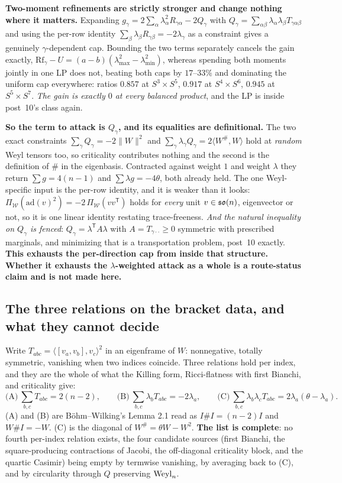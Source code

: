 \textbf{Two-moment refinements are strictly stronger and change nothing where it matters.} Expanding $g_\gamma=2\sum_\alpha\lambda_\alpha^2R_{\gamma\alpha}-2Q_\gamma$ with $Q_\gamma=\sum_{\alpha\beta}\lambda_\alpha\lambda_\beta T_{\gamma\alpha\beta}$ and using the per-row identity $\sum_\beta\lambda_\beta R_{\gamma\beta}=-2\lambda_\gamma$ as a constraint gives a genuinely $\gamma$-dependent cap. Bounding the two terms separately cancels the gain exactly, $\mathrm{Rf}_\gamma-U=(a-b)(\lambda_{\max}^2-\lambda_{\min}^2)$, whereas spending both moments jointly in one LP does not, beating both caps by $17$--$33\%$ and dominating the uniform cap everywhere: ratios $0.857$ at $S^3\times S^5$, $0.917$ at $S^4\times S^6$, $0.945$ at $S^5\times S^7$. \emph{The gain is exactly $0$ at every balanced product}, and the LP is inside post~10's class again.

\textbf{So the term to attack is $Q_\gamma$, and its equalities are definitional.} The two exact constraints $\sum_\gamma Q_\gamma=-2\|W\|^2$ and $\sum_\gamma\lambda_\gamma Q_\gamma=2\langle W^{\#},W\rangle$ hold at \emph{random} Weyl tensors too, so criticality contributes nothing and the second is the definition of $\#$ in the eigenbasis. Contracted against weight $1$ and weight $\lambda$ they return $\sum g=4(n-1)$ and $\sum\lambda g=-4\theta$, both already held. The one Weyl-specific input is the per-row identity, and it is weaker than it looks: $\Pi_{\mathcal W}(\mathrm{ad}(v)^2)=-2\,\Pi_{\mathcal W}(vv^{\mathsf T})$ holds for \emph{every} unit $v\in\mathfrak{so}(n)$, eigenvector or not, so it is one linear identity restating trace-freeness. \emph{And the natural inequality on $Q_\gamma$ is fenced}: $Q_\gamma=\lambda^{\mathsf T}A\lambda$ with $A=T_{\gamma\cdot\cdot}\ge0$ symmetric with prescribed marginals, and minimizing that is a transportation problem, post~10 exactly. \textbf{This exhausts the per-direction cap from inside that structure. Whether it exhausts the $\lambda$-weighted attack as a whole is a route-status claim and is not made here.}

\subsection{The three relations on the bracket data, and what they cannot decide}\label{sec:pinned}

Write $T_{abc}=\langle[v_a,v_b],v_c\rangle^2$ in an eigenframe of $W$: nonnegative, totally symmetric, vanishing when two indices coincide. Three relations hold per index, and they are the whole of what the Killing form, Ricci-flatness with first Bianchi, and criticality give:
\[
\text{(A)}\ \sum_{b,c}T_{abc}=2(n-2),\qquad
\text{(B)}\ \sum_{b,c}\lambda_bT_{abc}=-2\lambda_a,\qquad
\text{(C)}\ \sum_{b,c}\lambda_b\lambda_cT_{abc}=2\lambda_a(\theta-\lambda_a).
\]
(A) and (B) are B\"ohm--Wilking's Lemma 2.1 read as $I\#I=(n-2)I$ and $W\#I=-W$. (C) is the diagonal of $W^{\#}=\theta W-W^2$. \textbf{The list is complete}: no fourth per-index relation exists, the four candidate sources (first Bianchi, the square-producing contractions of Jacobi, the off-diagonal criticality block, and the quartic Casimir) being empty by termwise vanishing, by averaging back to (C), and by circularity through $Q$ preserving $\mathrm{Weyl}_n$.

